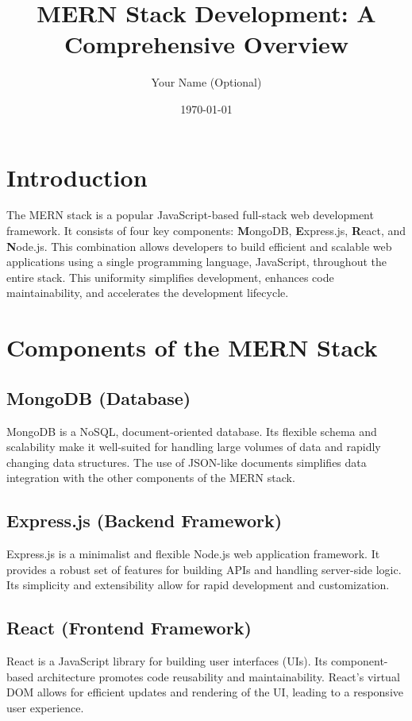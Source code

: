 \documentclass{article}
\title{MERN Stack Development: A Comprehensive Overview}
\author{Your Name (Optional)}
\date{\today}
\begin{document}
\maketitle

\section{Introduction}

The MERN stack is a popular JavaScript-based full-stack web development framework.  It consists of four key components: \textbf{M}ongoDB, \textbf{E}xpress.js, \textbf{R}eact, and \textbf{N}ode.js.  This combination allows developers to build efficient and scalable web applications using a single programming language, JavaScript, throughout the entire stack. This uniformity simplifies development, enhances code maintainability, and accelerates the development lifecycle.


\section{Components of the MERN Stack}

\subsection{MongoDB (Database)}

MongoDB is a NoSQL, document-oriented database. Its flexible schema and scalability make it well-suited for handling large volumes of data and rapidly changing data structures.  The use of JSON-like documents simplifies data integration with the other components of the MERN stack.

\subsection{Express.js (Backend Framework)}

Express.js is a minimalist and flexible Node.js web application framework.  It provides a robust set of features for building APIs and handling server-side logic.  Its simplicity and extensibility allow for rapid development and customization.

\subsection{React (Frontend Framework)}

React is a JavaScript library for building user interfaces (UIs).  Its component-based architecture promotes code reusability and maintainability.  React's virtual DOM allows for efficient updates and rendering of the UI, leading to a responsive user experience.
\end{document}
